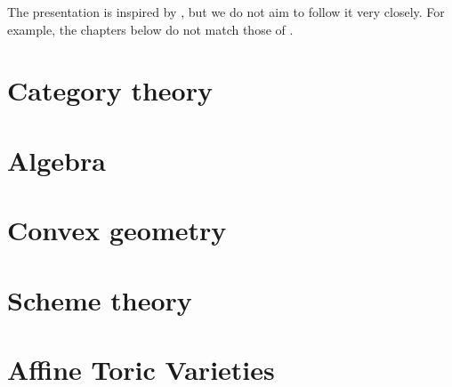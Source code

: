 %

The presentation is inspired by \cite{Cox_2011},
but we do not aim to follow it very closely.
For example, the chapters below do not match those of \cite{Cox_2011}.

\chapter{Category theory}




\chapter{Algebra}





\chapter{Convex geometry}



\chapter{Scheme theory}





\chapter{Affine Toric Varieties}




